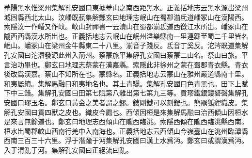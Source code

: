 華陽黑水惟梁州集解孔安國曰東據華山之南西距黑水。正義括地志云黑水源岀梁州城固縣西北太山。汶嶓既蓺集解鄭玄曰地理志岷山在蜀郡湔氐道嶓冢山在漢陽西。索隱汶一作崏又作㞶。㞶山封禪書一云瀆山在蜀都湔氐道西徼江水所岀。嶓冢山在隴西西縣漢水所岀也。正義括地志云岷山在岷州溢樂縣南一里連緜至蜀二千里皆名岷山。嶓冢山在梁州金牛縣東二十八里。湔音子踐反。氐音丁奚反。沱涔既道集解孔安國曰沱潛發源此州入荊州。蔡蒙旅平集解孔安國曰蔡蒙二山名。祭山曰旅。平言治功畢也。鄭玄曰地理志蔡蒙在漢嘉縣。索隱此非徐州之蒙在蜀郡青衣縣。青衣後改爲漢嘉。蔡山不知所在也。蒙縣名。正義括地志云蒙山在雅州嚴道縣南十里。和夷厎績。集解馬融曰和夷地名也。其土青驪。集解孔安國曰色青黑也。田下上賦下中三錯。集解孔安國曰田第七賦第八雜岀第七第九三等。貢璆鐵銀鏤砮磬集解孔安國曰璆玉名。鄭玄曰黃金之美者謂之鏐。鏤剛鐵可以刻鏤也。熊羆狐貍織皮。集解孔安國曰貢四獸之皮也。織皮今罽也。西傾因桓是來集解馬融曰治西傾山因桓水是來言無餘道也。鄭玄曰地理志西傾山在隴西臨洮。索隱西傾在隴西臨洮縣西南。桓水岀蜀郡㞶山西南行羌中入南海也。正義括地志云西傾山今嵹臺山在洮州臨潭縣西南三百三十六里。浮于潛踰于沔集解孔安國曰漢上水爲沔。鄭玄曰或謂漢爲沔。入于渭亂于河。集解孔安國曰正絕流曰亂。

